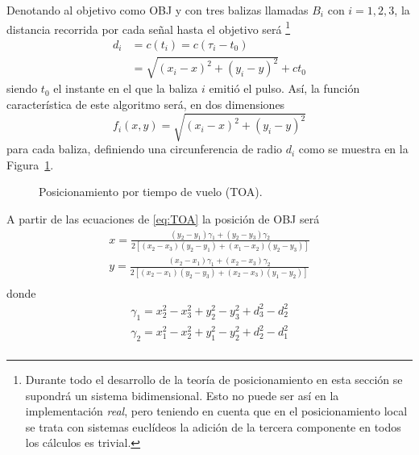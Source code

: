 Denotando al objetivo como OBJ y con tres balizas llamadas $B_i$ con $i=1,2,3$, la distancia recorrida por cada señal hasta el objetivo será \footnote{Durante todo el desarrollo de la teoría de posicionamiento en esta sección se supondrá un sistema bidimensional. Esto no puede ser así en la implementación \textit{real}, pero teniendo en cuenta que en el posicionamiento local se trata con sistemas euclídeos la adición de la tercera componente en todos los cálculos es trivial.}
\begin{equation}\label{eq:TOA}
    \begin{aligned}
        d_i &= c(t_i) = c(\tau_i - t_0) \\
        &= \sqrt{(x_i - x)^2 + (y_i - y)^2} + ct_0
    \end{aligned}
\end{equation}
siendo $t_0$ el instante en el que la baliza $i$ emitió el pulso.
Así, la función característica de este algoritmo será, en dos dimensiones
\begin{equation}
    f_i(x, y) = \sqrt{(x_i - x)^2 + (y_i - y)^2}
\end{equation}
para cada baliza, definiendo una circunferencia de radio $d_i$ como se muestra en la Figura~\ref{fig:TOA}.

\begin{figure}[H]
    \centering
    \def\svgwidth{0.6\linewidth}
    
	\caption{Posicionamiento por tiempo de vuelo (TOA).}
    \label{fig:TOA}
\end{figure}

A partir de las ecuaciones de \eqref{eq:TOA} la posición de OBJ será \cite{Zafer}
\begin{equation}
    \begin{aligned}
        x = \frac{(y_2-y_1)\gamma_1 + (y_2-y_3)\gamma_2}{2[(x_2-x_3)(y_2-y_1) + (x_1 - x_2)(y_2 - y_3)]}\\
        y = \frac{(x_2-x_1)\gamma_1 + (x_2-x_3)\gamma_2}{2[(x_2-x_1)(y_2-y_3) + (x_2 - x_3)(y_1 - y_2)]}\\
    \end{aligned}
\end{equation}
donde
\begin{equation}
    \begin{aligned}
        \gamma_1 = x_2^2 - x_3^2 + y_2^2 - y_3^2 + d_3^2 - d_2^2 \\
        \gamma_2 = x_1^2 - x_2^2 + y_1^2 - y_2^2 + d_2^2 - d_1^2 \\
    \end{aligned}
\end{equation}

